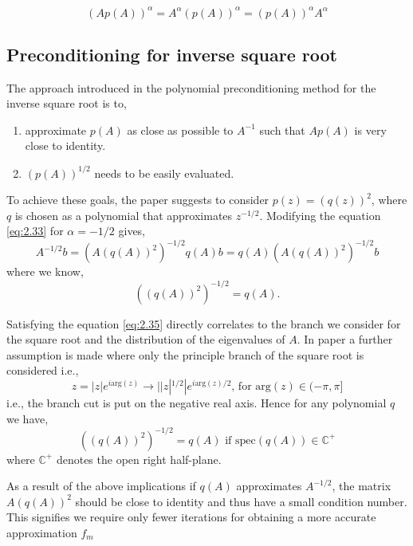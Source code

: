 \begin{equation}
    (Ap(A))^\alpha = A^\alpha (p(A))^\alpha = (p(A))^\alpha A^\alpha
    \label{eq:2.33}
\end{equation}

\subsection{Preconditioning for inverse square root}
\label{sec:pre_cond_inv_sqrt}

The approach introduced in the polynomial preconditioning method for the inverse square root is to,
\begin{enumerate}
    \item approximate $p(A)$ as close as possible to $A^{-1}$ such that $Ap(A)$ is very close to identity.
    \item $(p(A))^{1/2}$ needs to be easily evaluated.
\end{enumerate}

To achieve these goals, the paper\cite{49} suggests to consider $p(z) = (q(z))^{2}$, where $q$ is chosen as a polynomial that approximates $z^{-1/2}$. Modifying the equation \ref{eq:2.33} for $\alpha = -1/2$ gives,
\begin{equation}
    A^{-1/2}b = (A(q(A))^{2})^{-1/2}q(A)b = q(A)(A(q(A))^{2})^{-1/2}b
    \label{eq:2.34}
\end{equation}
where we know,
\begin{equation}
    ((q(A))^{2})^{-1/2} = q(A).
    \label{eq:2.35}
\end{equation}

Satisfying the equation \ref{eq:2.35} directly correlates to the branch we consider for the square root and the distribution of the eigenvalues of $A$. In paper \cite{49} a further assumption is made where only the principle branch of the square root is considered i.e.,
\[
    z = |z| e^{i \text{arg}(z)} \rightarrow ||z|^{1/2}| e^{i\text{arg}(z)/2} \text{, for } \text{arg}(z) \in (-\pi, \pi]
\]
i.e., the branch cut is put on the negative real axis. Hence for any polynomial $q$ we have,
\begin{equation}
    ((q(A))^{2})^{-1/2} = q(A) \text{ if spec}(q(A)) \in \mathbb{C}^{+}
    \label{eq:2.36}
\end{equation}
where $\mathbb{C}^{+}$ denotes  the open right half-plane.

As a result of the above implications if $q(A)$ approximates $A^{-1/2}$, the matrix $A(q(A))^{2}$ should be close to identity and thus have a small condition number. This signifies we require only fewer iterations for obtaining a more accurate approximation $f_{m}$

